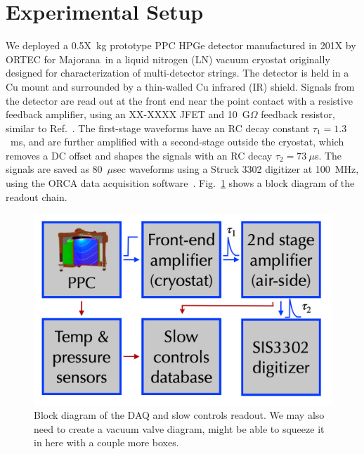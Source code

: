 \documentclass[nofootinbib,superscriptaddress, aps, prc, 
10pt, amsmath, amssymb, bibnotes,
altaffilletter, twocolumn, floatfix]{revtex4-2}
\def\MJ{{\sc Majorana}}
\begin{document}
\section{Experimental Setup}

    We deployed a 0.5X~kg prototype PPC HPGe detector manufactured in 201X by ORTEC for \MJ\ in a liquid nitrogen (LN) vacuum cryostat originally designed for characterization of multi-detector strings.
    The detector is held in a Cu mount and surrounded by a thin-walled Cu infrared (IR) shield.
    Signals from the detector are read out at the front end near the point contact with a resistive feedback amplifier, using an XX-XXXX JFET and 10~G$\Omega$ feedback resistor, similar to Ref.~\cite{majorana2022electronics}.
    The first-stage waveforms have an RC decay constant $\tau_1 = 1.3$~ms, and are further amplified with a second-stage outside the cryostat, which removes a DC offset and shapes the signals with an RC decay $\tau_2 = 73\ \mu$s.
    The signals are saved as 80~$\mu$sec waveforms using a Struck 3302 digitizer at 100~MHz, using the ORCA data acquisition software~\cite{howe2008orca}.
    Fig.~\ref{fig:readout} shows a block diagram of the readout chain.

    \begin{figure}
        \includegraphics[width=\columnwidth]{krstc_readout.png}
        \caption{Block diagram of the DAQ and slow controls readout.  We may also need to create a vacuum valve diagram, might be able to squeeze it in here with a couple more boxes.}
        \label{fig:readout}
    \end{figure}    
    
\end{document}
